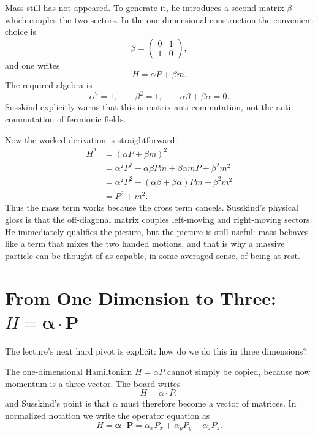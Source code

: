 Mass still has not appeared. To generate it, he introduces a second matrix \(\beta\) which couples the two sectors. In the one-dimensional construction the convenient choice is
\begin{equation}
\beta=
\begin{pmatrix}
0&1\\
1&0
\end{pmatrix},
\end{equation}
and one writes
\begin{equation}
H=\alpha P+\beta m.
\end{equation}
The required algebra is
\begin{equation}
\alpha^2=1,
\qquad
\beta^2=1,
\qquad
\alpha\beta+\beta\alpha=0.
\end{equation}
Susskind explicitly warns that this is matrix anti-commutation, not the anti-commutation of fermionic fields.

Now the worked derivation is straightforward:
\begin{align}
H^2
&=(\alpha P+\beta m)^2 \\
&=\alpha^2P^2+\alpha\beta Pm+\beta\alpha mP+\beta^2m^2 \\
&=\alpha^2P^2+(\alpha\beta+\beta\alpha)Pm+\beta^2m^2 \\
&=P^2+m^2.
\end{align}
Thus the mass term works because the cross term cancels. Susskind's physical gloss is that the off-diagonal matrix couples left-moving and right-moving sectors. He immediately qualifies the picture, but the picture is still useful: mass behaves like a term that mixes the two handed motions, and that is why a massive particle can be thought of as capable, in some averaged sense, of being at rest.

\section{From One Dimension to Three: \texorpdfstring{$H=\boldsymbol{\alpha}\cdot\mathbf P$}{H=alpha.P}}

The lecture's next hard pivot is explicit: how do we do this in three dimensions?

The one-dimensional Hamiltonian \(H=\alpha P\) cannot simply be copied, because now momentum is a three-vector. The board writes
\begin{equation}
H=\alpha\cdot P,
\end{equation}
and Susskind's point is that \(\alpha\) must therefore become a vector of matrices. In normalized notation we write the operator equation as
\begin{equation}
H=\boldsymbol{\alpha}\cdot\mathbf P
=\alpha_xP_x+\alpha_yP_y+\alpha_zP_z.
\end{equation}

